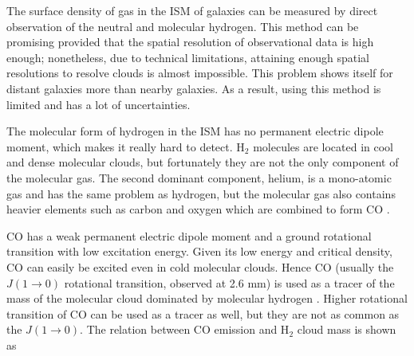 \documentclass[useAMS,usenatbib]{mn2e}
\begin{document}
The surface density of gas in the ISM of galaxies can be measured by direct observation of the neutral and molecular hydrogen. This method can be promising provided that the spatial resolution of observational data is high enough; nonetheless, due to technical limitations, attaining enough spatial resolutions to resolve clouds is almost impossible. This problem shows itself for distant galaxies more than nearby galaxies. As a result, using this method is limited and has a lot of uncertainties.

 The molecular form of hydrogen in the ISM has no permanent electric dipole moment, which makes it really hard to detect. H$_2$ molecules are located in cool and dense molecular clouds, but fortunately they are not the only component of the molecular gas. The second dominant component, helium, is a mono-atomic gas and has the same problem as hydrogen, but the molecular gas also contains heavier elements such as carbon and oxygen which are combined to form CO \citep{Bolato13}.

CO has a weak permanent electric dipole moment and a ground rotational transition with low excitation energy. Given its low energy and critical density, CO can easily be excited even in cold molecular clouds. Hence CO (usually the $J(1\rightarrow 0)$ rotational transition, observed at 2.6 mm) is used as a tracer of the mass of the molecular cloud dominated by molecular hydrogen \citep[see, for example,][] {Sanders84}. Higher rotational transition of CO can be used as a tracer as well, but they are not as common as the $J(1\rightarrow 0)$. The relation between CO emission and H$_2$ cloud mass is shown as
\end{document}

